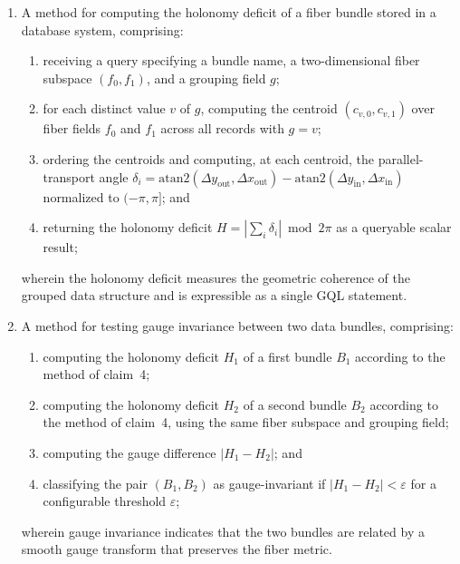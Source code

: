 \documentclass[11pt,letterpaper]{article}
\begin{document}
\begin{enumerate}
\item A method for computing the holonomy deficit of a fiber bundle stored in a database system, comprising:
\begin{enumerate}[label=(\alph*)]
  \item receiving a query specifying a bundle name, a two-dimensional fiber subspace $(f_0, f_1)$, and a grouping field $g$;
  \item for each distinct value $v$ of $g$, computing the centroid $(c_{v,0}, c_{v,1})$ over fiber fields $f_0$ and $f_1$ across all records with $g = v$;
  \item ordering the centroids and computing, at each centroid, the parallel-transport angle $\delta_i = \mathrm{atan2}(\Delta y_{\mathrm{out}}, \Delta x_{\mathrm{out}}) - \mathrm{atan2}(\Delta y_{\mathrm{in}}, \Delta x_{\mathrm{in}})$ normalized to $(-\pi, \pi]$; and
  \item returning the holonomy deficit $H = |\sum_i \delta_i| \bmod 2\pi$ as a queryable scalar result;
\end{enumerate}
wherein the holonomy deficit measures the geometric coherence of the grouped data structure and is expressible as a single GQL statement.

\item A method for testing gauge invariance between two data bundles, comprising:
\begin{enumerate}[label=(\alph*)]
  \item computing the holonomy deficit $H_1$ of a first bundle $B_1$ according to the method of claim~4;
  \item computing the holonomy deficit $H_2$ of a second bundle $B_2$ according to the method of claim~4, using the same fiber subspace and grouping field;
  \item computing the gauge difference $|H_1 - H_2|$; and
  \item classifying the pair $(B_1, B_2)$ as gauge-invariant if $|H_1 - H_2| < \varepsilon$ for a configurable threshold $\varepsilon$;
\end{enumerate}
wherein gauge invariance indicates that the two bundles are related by a smooth gauge transform that preserves the fiber metric.


\end{enumerate}
\end{document}
